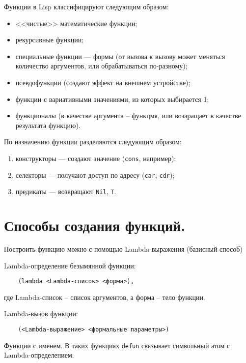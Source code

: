 Функции в Lisp классифицируют следующим образом:

\begin{itemize}
    \item <<чистые>> математические функции;
    \item рекурсивные функции;
    \item специальные функции --- формы (от вызова к вызову может меняться количество аргументов, или обрабатываться по-разному);
    \item псевдофункции (создают эффект на внешнем устройстве);
    \item функции с вариативными значениями, из которых выбирается 1;
    \item функционалы (в качестве аргумента -- функцмя, или возаращает в качестве результата функцию).
\end{itemize}

По назначению функции разделяются следующим образом:

\begin{enumerate}
    \item конструкторы --- создают значение (\texttt{cons}, например);
    \item селекторы --- получают доступ по адресу (\texttt{car}, \texttt{cdr});
    \item предикаты --- возвращают \texttt{Nil}, \texttt{T}.
\end{enumerate}

\section{Способы создания функций.}

Построить функцию можно с помощью Lambda-выражения (базисный способ)

Lambda-определение безымянной функции:

\begin{lstlisting}
	(lambda <Lambda-список> <форма>),
\end{lstlisting}

где Lambda-список -- список аргументов, а форма -- тело функции.

Lambda-вызов функции:

\begin{lstlisting}
	(<Lambda-выражение> <формальные параметры>)
\end{lstlisting}

Функции с именем. В таких функциях \texttt{defun} связывает символьный атом с Lambda-определением:

